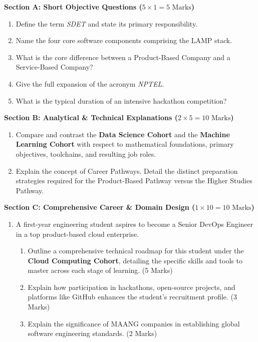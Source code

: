 \begin{chaptertest}
\noindent\textbf{Section A: Short Objective Questions ($5 \times 1 = 5\text{ Marks}$)}
\begin{enumerate}[leftmargin=1.5em]
    \item Define the term \textit{SDET} and state its primary responsibility.
    \item Name the four core software components comprising the LAMP stack.
    \item What is the core difference between a Product-Based Company and a Service-Based Company?
    \item Give the full expansion of the acronym \textit{NPTEL}.
    \item What is the typical duration of an intensive hackathon competition?
\end{enumerate}

\medskip
\noindent\textbf{Section B: Analytical \& Technical Explanations ($2 \times 5 = 10\text{ Marks}$)}
\begin{enumerate}[leftmargin=1.5em, start=6]
    \item Compare and contrast the \textbf{Data Science Cohort} and the \textbf{Machine Learning Cohort} with respect to mathematical foundations, primary objectives, toolchains, and resulting job roles.
    \item Explain the concept of Career Pathways. Detail the distinct preparation strategies required for the Product-Based Pathway versus the Higher Studies Pathway.
\end{enumerate}

\medskip
\noindent\textbf{Section C: Comprehensive Career \& Domain Design ($1 \times 10 = 10\text{ Marks}$)}
\begin{enumerate}[leftmargin=1.5em, start=8]
    \item A first-year engineering student aspires to become a Senior DevOps Engineer in a top product-based cloud enterprise.
    \begin{enumerate}[label=(\alph*)]
        \item Outline a comprehensive technical roadmap for this student under the \textbf{Cloud Computing Cohort}, detailing the specific skills and tools to master across each stage of learning. (5 Marks)
        \item Explain how participation in hackathons, open-source projects, and platforms like GitHub enhances the student's recruitment profile. (3 Marks)
        \item Explain the significance of MAANG companies in establishing global software engineering standards. (2 Marks)
    \end{enumerate}
\end{enumerate}
\end{chaptertest}

